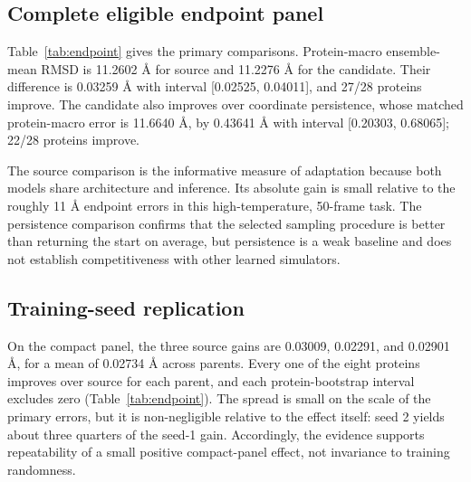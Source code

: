 \documentclass{article}
\begin{document}
\subsection{Complete eligible endpoint panel}

Table~\ref{tab:endpoint} gives the primary comparisons. Protein-macro ensemble-mean RMSD is 11.2602 \AA\@{} for source and 11.2276 \AA\@{} for the candidate. Their difference is 0.03259 \AA\@{} with interval [0.02525, 0.04011], and 27/28 proteins improve. The candidate also improves over coordinate persistence, whose matched protein-macro error is 11.6640 \AA\@{}, by 0.43641 \AA\@{} with interval [0.20303, 0.68065]; 22/28 proteins improve.

The source comparison is the informative measure of adaptation because both models share architecture and inference. Its absolute gain is small relative to the roughly 11 \AA\@{} endpoint errors in this high-temperature, 50-frame task. The persistence comparison confirms that the selected sampling procedure is better than returning the start on average, but persistence is a weak baseline and does not establish competitiveness with other learned simulators.

\subsection{Training-seed replication}

On the compact panel, the three source gains are 0.03009, 0.02291, and 0.02901 \AA\@{}, for a mean of 0.02734 \AA\@{} across parents. Every one of the eight proteins improves over source for each parent, and each protein-bootstrap interval excludes zero (Table~\ref{tab:endpoint}). The spread is small on the scale of the primary errors, but it is non-negligible relative to the effect itself: seed 2 yields about three quarters of the seed-1 gain. Accordingly, the evidence supports repeatability of a small positive compact-panel effect, not invariance to training randomness.
\end{document}
